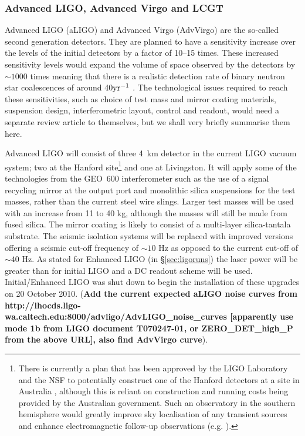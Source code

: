 \documentclass{article}
\begin{document}
\subsubsection{Advanced LIGO, Advanced Virgo and LCGT}\label{subsection:aligo}
Advanced LIGO (aLIGO) \cite{Harry:2010, AdvLIGO, AdvLIGOweb} and Advanced Virgo (AdvVirgo)
\cite{AdvVirgo, AdvVirgoweb} are the so-called second generation detectors.
They are planned to have a sensitivity increase over the levels of the initial
detectors by a factor of 10--15 times. These increased sensitivity levels would
expand the volume of space observed by the detectors by $\sim1000$ times meaning
that there is a realistic detection rate of binary neutron star coalescences of
around 40${\rm yr}^{-1}$ \cite{Abadie:2010e, Kopparapu:2008}. The technological issues
required to reach these sensitivities, such as choice of test mass and mirror
coating materials, suspension design, interferometric layout, control and
readout, would need a separate review article to themselves, but we shall very
briefly summarise them here.

Advanced LIGO will consist of three 4~km detector in the current LIGO vacuum system;
two at the Hanford site\footnote{There is currently a plan that
has been approved by the LIGO Laboratory and the NSF to potentially construct one of the 
Hanford detectors at a site in Australia \cite{Marx:2010}, although this is reliant
on construction and running costs being provided by the Australian government.
Such an observatory in the southern hemisphere would greatly improve sky localisation
of any transient sources and enhance electromagnetic follow-up observations (e.g. 
\cite{Barriga:2010}).} and one at Livingston. It will apply some of the
technologies from the GEO~600 interferometer such as the use of a signal
recycling mirror at the output port and monolithic silica suspensions for the
test masses, rather than the current steel wire slings. Larger test masses will
be used with an increase from 11 to 40 kg, although the masses will still be
made from fused silica. The mirror coating is likely to consist of a
multi-layer silica-tantala substrate. The seismic isolation systems will be
replaced with improved versions offering a seismic cut-off frequency of $\sim10$
Hz as opposed to the current cut-off of $\sim40$ Hz. As stated for Enhanced LIGO 
(in \S\ref{sec:ligoruns}) the laser power will be greater than for initial 
LIGO and a DC readout scheme will be used. Initial/Enhanced LIGO was shut down 
to begin the installation of these upgrades on 20 October 2010. ({\bf Add the current
expected aLIGO noise curves from
http://lhocds.ligo-wa.caltech.edu:8000/advligo/AdvLIGO\_noise\_curves
[apparently use mode 1b from LIGO document T070247-01, or ZERO\_DET\_high\_P
from the above URL], also find AdvVirgo curve}).
\end{document}
